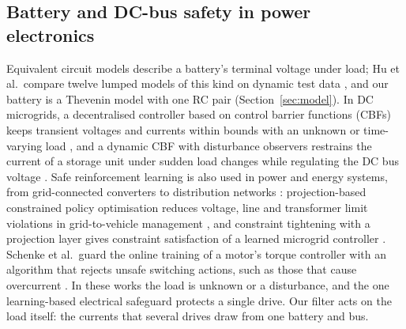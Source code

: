 \subsection{Battery and DC-bus safety in power electronics}\label{sec:rw-power}
Equivalent circuit models describe a battery's terminal voltage under load; Hu et al.\ compare twelve lumped models of this kind on dynamic test data \cite{hu2012ecm}, and our battery is a Thevenin model with one RC pair (Section~\ref{sec:model}). In DC microgrids, a decentralised controller based on control barrier functions (CBFs) keeps transient voltages and currents within bounds with an unknown or time-varying load \cite{kosaraju2022microgrid}, and a dynamic CBF with disturbance observers restrains the current of a storage unit under sudden load changes while regulating the DC bus voltage \cite{fu2026bess}. Safe reinforcement learning is also used in power and energy systems, from grid-connected converters to distribution networks \cite{bui2025review}: projection-based constrained policy optimisation reduces voltage, line and transformer limit violations in grid-to-vehicle management \cite{zhang2025g2v}, and constraint tightening with a projection layer gives constraint satisfaction of a learned microgrid controller \cite{liu2026ampc}. Schenke et al.\ guard the online training of a motor's torque controller with an algorithm that rejects unsafe switching actions, such as those that cause overcurrent \cite{schenke2023safe}. In these works the load is unknown or a disturbance, and the one learning-based electrical safeguard protects a single drive. Our filter acts on the load itself: the currents that several drives draw from one battery and bus.

